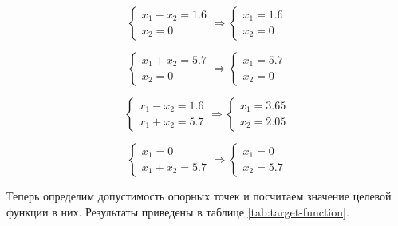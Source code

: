 \begin{enumerate}
\begin{equation}
\begin{cases}
	x_1 - x_2 = 1.6
	\\
	x_2 = 0
\end{cases}
\Rightarrow
\begin{cases}
	x_1 = 1.6
	\\
	x_2 = 0
\end{cases}
\end{equation}

\begin{equation}
\begin{cases}
	x_1 + x_2 = 5.7
	\\
	x_2 = 0
\end{cases}
\Rightarrow
\begin{cases}
	x_1 = 5.7
	\\
	x_2 = 0
\end{cases}
\end{equation}

\begin{equation}
\begin{cases}
	x_1 - x_2 = 1.6
	\\
	x_1 + x_2 = 5.7
\end{cases}
\Rightarrow
\begin{cases}
	x_1 = 3.65
	\\
	x_2 = 2.05
\end{cases}
\end{equation}

\begin{equation}
\label{eq:2:7}
\begin{cases}
	x_1 = 0
	\\
	x_1 + x_2 = 5.7
\end{cases}
\Rightarrow
\begin{cases}
	x_1 = 0
	\\
	x_2 = 5.7
\end{cases}
\end{equation}

Теперь определим допустимость опорных точек и посчитаем значение целевой функции в них. Результаты приведены в таблице \ref{tab:target-function}.


\end{enumerate}

